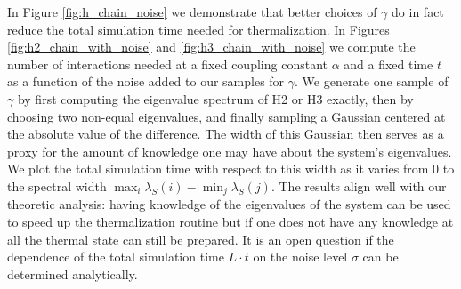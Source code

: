 \documentclass[
 amsmath,amssymb,
 aps,
onecolumn, 
nofootinbib]{revtex4-2}
\begin{document}
In Figure \ref{fig:h_chain_noise} we demonstrate that better choices of $\gamma$ do in fact reduce the total simulation time needed for thermalization. In Figures \ref{fig:h2_chain_with_noise} and \ref{fig:h3_chain_with_noise} we compute the number of interactions needed at a fixed coupling constant $\alpha$ and a fixed time $t$ as a function of the noise added to our samples for $\gamma$. We generate one sample of $\gamma$ by first computing the eigenvalue spectrum of H2 or H3 exactly, then by choosing two non-equal eigenvalues, and finally sampling a Gaussian centered at the absolute value of the difference. The width of this Gaussian then serves as a proxy for the amount of knowledge one may have about the system's eigenvalues. We plot the total simulation time with respect to this width as it varies from 0 to the spectral width $\max_i \lambda_S(i) - \min_j \lambda_S(j)$. The results align well with our theoretic analysis: having knowledge of the eigenvalues of the system can be used to speed up the thermalization routine but if one does not have any knowledge at all the thermal state can still be prepared. It is an open question if the dependence of the total simulation time $L \cdot t$ on the noise level $\sigma$ can be determined analytically.
\end{document}
